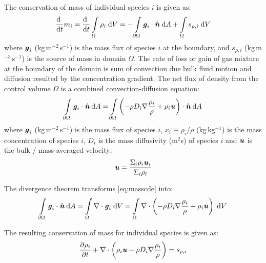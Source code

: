 The conservation of mass of individual species $i$ is given as:
\begin{equation}
\frac{\mathrm{d}~}{\mathrm{d}t} {m_i} = \frac{\mathrm{d}~}{\mathrm{d}t} \int \limits_{\Omega} \rho_i\;\mathrm{d}V= - \int \limits_{\partial \Omega } \textbf{\textit{g}}_i\cdot\hat{\textbf{\textit{n}}}\;\mathrm{d}A + \int \limits_{\Omega} s_{\rho,i}\;\mathrm{d}V
\end{equation}
where $\textbf{\textit{g}}_i$ (kg\,m$^{-2}$\,s$^{-1}$) is the mass flux of species $i$ at the boundary, and $s_{\rho,i}$ (kg\,m$^{-3}$\,s$^{-1}$) is the source of mass in domain $\Omega$. The rate of loss or gain of gas mixture at the boundary of the domain is sum of convection due bulk fluid motion and diffusion resulted by the concentration gradient. The net flux of density from the control volume $\Omega$ is a combined convection-diffusion equation:
\begin{equation}
\int \limits_{\partial \Omega } {{{\textbf{\textit{g}}}_i}}  \cdot \hat{\textbf{\textit{n}}}\:\mathrm{d}A = \int \limits_{\partial \Omega } {\left( { - {\rho}{D_i}\nabla \frac{{{\rho _i}}}{{{\rho}}} + {\rho _i}{\textbf{\textit{u}}}} \right)}  \cdot \hat{\textbf{\textit{n}}}\:\mathrm{d}A
\label{eq:masscde}
\end{equation}
where $\textbf{\textit{g}}_i$ (kg\,m$^{-2}$\,s$^{-1}$) is the mass flux of species $i$, $x_i \equiv \rho_i/\rho$ (kg\,kg$^{-1}$) is the mass concentration of species $i$, $D_i$ is the mass diffusivity (m$^2$s) of species $i$ and $\textbf{\textit{u}}$ is the bulk / mass-averaged velocity:
\begin{equation}
{\textbf{\textit{u}}} = \frac{{{\Sigma _i}{\rho _i}{{\textbf{\textit{u}}}_i}}}{{{\Sigma _i}{\rho _i}}}
\end{equation}

The divergence theorem transforms \ref{eq:masscde} into:
\begin{equation}
\int \limits_{\partial \Omega } {{{\textbf{\textit{g}}}_i}}  \cdot \hat{\textbf{\textit{n}}}\:\mathrm{d}A = \int \limits_\Omega  \nabla  \cdot {{\textbf{\textit{g}}}_i}\;\mathrm{d}V = \int \limits_\Omega  \nabla  \cdot \left( { - \rho D_i\nabla \frac{{{\rho _i}}}{{{\rho }}} + {\rho _i}{\textbf{\textit{u}}}} \right)\;\mathrm{d}V
\end{equation}

The resulting conservation of mass for individual species is given as:
\begin{equation}
\frac{{\partial {\rho _i}}}{{\partial t}} + \nabla  \cdot \left( {{\rho _i}{\textbf{\textit{u}}} - {\rho}{D_i}\nabla \frac{{{\rho _i}}}{{{\rho}}}} \right) = {s_{\rho ,i}}
\end{equation}

